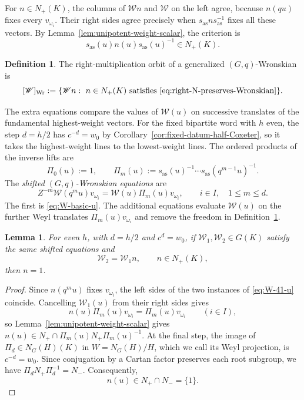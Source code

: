 \documentclass[11pt,leqno]{amsart}
\numberwithin{equation}{section}
\theoremstyle{plain}
\newtheorem{lemma}[theorem]{Lemma}
\theoremstyle{definition}
\newtheorem{definition}[theorem]{Definition}
\theoremstyle{plain}
\theoremstyle{definition}
\theoremstyle{remark}
\begin{document}
For $n\in N_+(K)$, the columns of $\mathscr Wn$ and $\mathscr W$ on the left agree, because $n(qu)$ fixes every $v_{\omega_i}$.  Their right sides agree precisely when $s_{\mathrm{as}}ns_{\mathrm{as}}^{-1}$ fixes all these vectors.  By Lemma~\ref{lem:unipotent-weight-scalar}, the criterion is
\begin{equation}\label{eq:right-N-preserves-Wronskian}
 s_{\mathrm{as}}(u)n(u)s_{\mathrm{as}}(u)^{-1}\in N_+(K).
\end{equation}

\begin{definition}\label{def:Wronskian-right-orbit}
The right-multiplication orbit of a generalized $(G,q)$-Wronskian is
\[
 [\mathscr W]_{\mathrm{Wr}}
 :=\{\mathscr Wn:\ n\in N_+(K)\text{ satisfies }\eqref{eq:right-N-preserves-Wronskian}\}.
\qedhere
\]
\end{definition}

The extra equations compare the values of $\mathscr W(u)$ on successive translates of the fundamental highest-weight vectors.  For the fixed bipartite word with $h$ even, the step $d=h/2$ has $c^{-d}=w_0$ by Corollary~\ref{cor:fixed-datum-half-Coxeter}, so it takes the highest-weight lines to the lowest-weight lines.  The ordered products of the inverse lifts are
\[
 \Pi_0(u):=1,\qquad
 \Pi_m(u):=s_{\mathrm{as}}(u)^{-1}\cdots s_{\mathrm{as}}(q^{m-1}u)^{-1}.
\]
The \emph{shifted $(G,q)$-Wronskian equations} are
\begin{equation}\label{eq:W-41-u}
 Z^{-m}\mathscr W(q^mu)v_{\omega_i}
 =\mathscr W(u)\Pi_m(u)v_{\omega_i},
 \qquad i\in I,\quad 1\le m\le d.
\end{equation}
The first is \eqref{eq:W-basic-u}.  The additional equations evaluate $\mathscr W(u)$ on the further Weyl translates $\Pi_m(u)v_{\omega_i}$ and remove the freedom in Definition~\ref{def:Wronskian-right-orbit}.

\begin{lemma}\label{lem:finite-shift-uniqueness}
For even $h$, with $d=h/2$ and $c^d=w_0$, if $\mathscr W_1,\mathscr W_2\in G(K)$ satisfy the same shifted equations and
\[
 \mathscr W_2=\mathscr W_1n,
 \qquad n\in N_+(K),
\]
then $n=1$.
\end{lemma}

\begin{proof}
Since $n(q^mu)$ fixes $v_{\omega_i}$, the left sides of the two instances of \eqref{eq:W-41-u} coincide.  Cancelling $\mathscr W_1(u)$ from their right sides gives
\[
 n(u)\Pi_m(u)v_{\omega_i}=\Pi_m(u)v_{\omega_i}
 \qquad(i\in I),
\]
so Lemma~\ref{lem:unipotent-weight-scalar} gives $n(u)\in N_+\cap \Pi_m(u)N_+\Pi_m(u)^{-1}$.  At the final step, the image of $\Pi_d\in N_G(H)(K)$ in $W=N_G(H)/H$, which we call its Weyl projection, is $c^{-d}=w_0$.  Since conjugation by a Cartan factor preserves each root subgroup, we have $\Pi_dN_+\Pi_d^{-1}=N_-$.  Consequently,
\[
 n(u)\in N_+\cap N_-=\{1\}.
\]
\end{proof}
\end{document}
